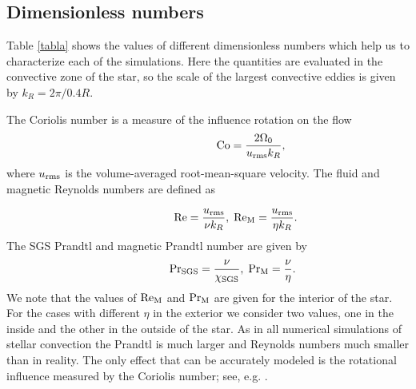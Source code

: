 \documentclass[baaa]{baaa}
\begin{document}
\subsection{Dimensionless numbers}

Table \ref{tabla} shows the values of different dimensionless numbers which help us to characterize each of the simulations. Here the quantities are evaluated in the convective zone of the star, so the scale of the largest convective eddies is given by $k_R = 2\pi/0.4R$.

The Coriolis number is a measure of the influence rotation on the flow
\begin{equation}
    \;\;\;\;\;\;\;\;\;\;\;\;\;\;\;\;\;\;\;\;\;\;\;\;\;\;\;\;{\rm Co} = \frac{2\Omega_0}{u_{\rm rms} k_{R}},
\end{equation}
where $u_{\rm rms}$ is the volume-averaged root-mean-square velocity. The fluid and magnetic Reynolds numbers are defined as

\begin{equation}
   \;\;\;\;\;\;\;\;\;\;\;\;\;\;\;\;\;\;{\rm Re} = \frac{u_{\rm rms}}{\nu k_{R}}, \; {\rm Re_{\rm M}} = \frac{u_{\rm rms}}{\eta k_{R}}.
\end{equation}
The SGS Prandtl and magnetic Prandtl number are given by
\begin{equation}
    \;\;\;\;\;\;\;\;\;\;\;\;\;\;\;\;{\rm Pr_{SGS}} = \frac{\nu}{\chi_{\rm SGS}}, \; {\rm Pr_{\rm M}} = \frac{\nu}{\eta}.
\end{equation}
We note that the values of ${\rm Re_{\rm M}}$ and $\rm Pr_{\rm M}$ are given for the interior of the star. For the cases with different $\eta$ in the exterior we consider two values, one in the inside and the other in the outside of the star.
As in all numerical simulations of stellar convection the Prandtl is much larger and Reynolds numbers much smaller than in reality. The only effect that can be accurately modeled is the rotational influence measured by the Coriolis number; see, e.g. \cite{2023SSRv..219...58K}.
\end{document}

